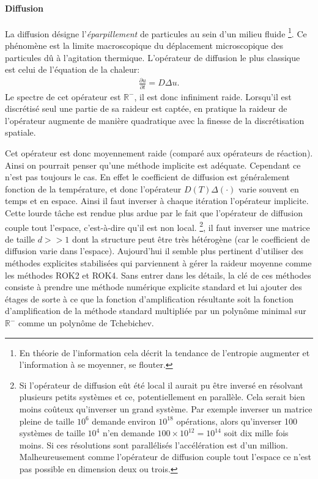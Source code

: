 \paragraph{Diffusion}
    La diffusion désigne l'\textit{éparpillement} de particules au sein d'un milieu fluide
    \footnote{En théorie de l'information cela décrit la tendance de l'entropie augmenter et l'information à se moyenner, se flouter.}.
    Ce phénomène est la limite macroscopique du déplacement microscopique
    des particules dû à l'agitation thermique. L'opérateur de diffusion le plus classique est celui de l'équation de la chaleur:
    \begin{align} \frac{\partial u}{\partial t} = D \Delta u.\end{align}
    Le spectre de cet opérateur est $\mathbb R^-$, il est donc infiniment raide. Lorsqu'il est discrétisé seul une partie de sa raideur est captée,
    en pratique la raideur de l'opérateur augmente de manière quadratique avec la finesse de la discrétisation spatiale.\par
    Cet opérateur est donc moyennement raide (comparé aux opérateurs de réaction). Ainsi on pourrait penser qu'une méthode implicite est adéquate. Cependant ce n'est pas toujours le cas.
    En effet le coefficient de diffusion est généralement fonction de la température, et donc l’opérateur $D(T) \Delta(\cdot)$ varie souvent en temps et en espace. 
    Ainsi il faut inverser à chaque itération l'opérateur implicite. Cette lourde tâche est rendue plus ardue par le fait que l'opérateur de diffusion couple tout l'espace, c'est-à-dire qu'il est non local.
    \footnote{Si l'opérateur de diffusion eût été local il aurait pu être inversé en résolvant plusieurs petits systèmes et ce, potentiellement en parallèle.
    Cela serait bien moins coûteux qu'inverser un grand système. 
    Par exemple inverser un matrice pleine de taille $10^6$ demande environ $10^{18}$ opérations, alors qu'inverser 100 systèmes de taille $10^4$
    n'en demande $100 \times 10^{12} = 10^{14}$ soit dix mille fois moins. Si ces résolutions sont parallélisés l'accélération est d'un million. Malheureusement comme
    l'opérateur de diffusion couple tout l'espace ce n'est pas possible en dimension deux ou trois.},
    il faut inverser une matrice de taille $d >> 1$ dont la structure
    peut être très hétérogène (car le coefficient de diffusion varie dans l'espace). Aujourd'hui il semble plus pertinent
    d'utiliser des méthodes explicites stabilisées qui parviennent à gérer la raideur moyenne comme les méthodes 
    ROK2 et ROK4\cite{abdulle2002fourth}. Sans entrer dans les détails, la clé de ces méthodes consiste à prendre une méthode numérique explicite standard et lui ajouter des étages 
    de sorte à ce que la fonction d'amplification résultante soit la fonction d'amplification de la méthode standard multipliée par un polynôme minimal sur $\mathbb R^-$
    comme un polynôme de Tchebichev.

